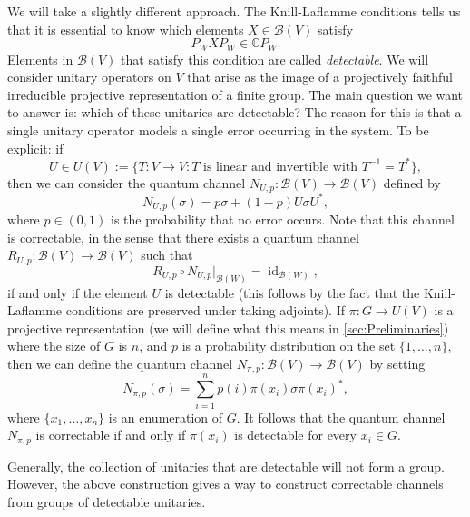 \documentclass[11pt, oneside, reqno]{amsart}
\newcommand{\calB}{\mathcal{B}}
\newcommand{\bbC}{\mathbb{C}}
\newcommand{\id}{\operatorname{id}}
\theoremstyle{definition}
\theoremstyle{plain}
\theoremstyle{remark}
\begin{document}
We will take a slightly different approach. The Knill-Laflamme conditions tells us that it is essential to know which elements $X \in \calB(V)$ satisfy 
\begin{equation}\label{eqn:Knill-Laflamme conditions 2}
    P_W X P_W \in \bbC P_W.
\end{equation}
Elements in $\calB(V)$ that satisfy this condition are called \emph{detectable}. We will consider unitary operators on $V$ that arise as the image of a projectively faithful irreducible projective representation of a finite group. The main question we want to answer is: which of these unitaries are detectable? The reason for this is that a single unitary operator models a single error occurring in the system. To be explicit: if
\begin{equation*}
    U \in U(V):= \{ T \colon V \to V : T \text{ is linear and invertible with } T^{-1} = T^* \},
\end{equation*}
then we can consider the quantum channel $N_{U,p} \colon \calB(V) \to \calB(V)$ defined by
\begin{equation*}
    N_{U,p}(\sigma) = p\sigma + (1 - p) U \sigma U^*,
\end{equation*}
where $p \in (0,1)$ is the probability that no error occurs. Note that this channel is correctable, in the sense that there exists a quantum channel $R_{U,p} \colon \calB(V) \to \calB(V)$ such that
\begin{equation*}
    R_{U,p} \circ N_{U,p} |_{\calB(W)} = \id_{\calB(W)},
\end{equation*}
if and only if the element $U$ is detectable (this follows by the fact that the Knill-Laflamme conditions are preserved under taking adjoints). If $\pi \colon G \to U(V)$ is a projective representation (we will define what this means in \cref{sec:Preliminaries}) where the size of $G$ is $n$, and $p$ is a probability distribution on the set $\{1,\dots,n\}$, then we can define the quantum channel $N_{\pi,p} \colon \calB(V) \to \calB(V)$ by setting
\begin{equation*}
    N_{\pi,p}(\sigma) = \sum_{i = 1}^{n} p(i) \pi(x_i) \sigma \pi(x_i)^*,
\end{equation*}
where $\{x_1,\dots,x_n\}$ is an enumeration of $G$. It follows that the quantum channel $N_{\pi,p}$ is correctable if and only if $\pi(x_i)$ is detectable for every $x_i \in G$.

Generally, the collection of unitaries that are detectable will not form a group. However, the above construction gives a way to construct correctable channels from groups of detectable unitaries.
\end{document}
